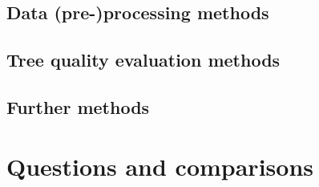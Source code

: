 
\chapter{Data (pre-)processing methods}




\chapter{Tree quality evaluation methods}



\chapter{Further methods}



   
\newpage

\part{Questions and comparisons}



{}
\listoffigures
{}
\listoftables

